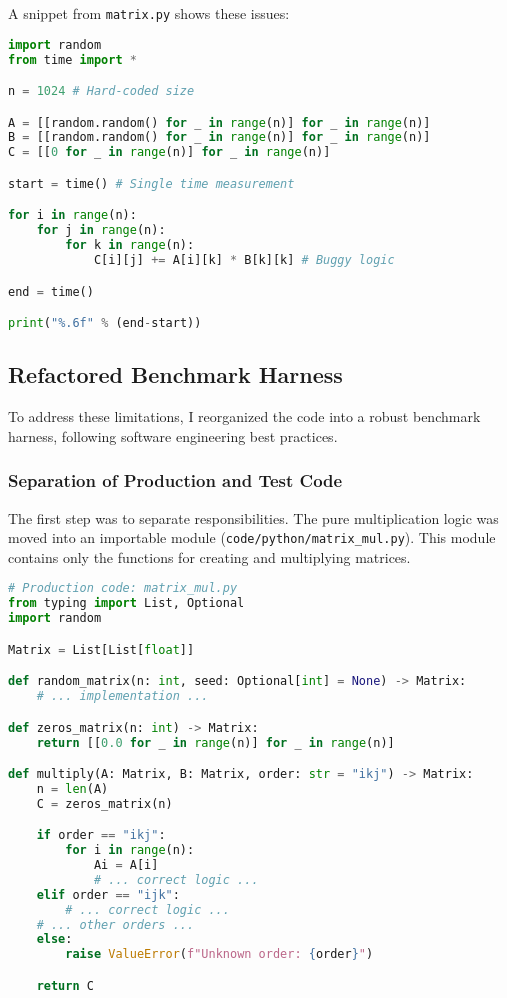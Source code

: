 \documentclass[a4paper]{article}
\begin{document}
A snippet from \texttt{matrix.py} shows these issues:
\begin{lstlisting}[language=Python, caption={Snippet from the initial 'matrix.py'}]
import random
from time import *

n = 1024 # Hard-coded size

A = [[random.random() for _ in range(n)] for _ in range(n)]
B = [[random.random() for _ in range(n)] for _ in range(n)]
C = [[0 for _ in range(n)] for _ in range(n)]

start = time() # Single time measurement

for i in range(n):
    for j in range(n):
        for k in range(n):
            C[i][j] += A[i][k] * B[k][k] # Buggy logic

end = time()

print("%.6f" % (end-start))
\end{lstlisting}

\subsection{Refactored Benchmark Harness}
To address these limitations, I reorganized the code into a robust benchmark harness, following software engineering best practices.

\subsubsection{Separation of Production and Test Code}
The first step was to separate responsibilities. The pure multiplication logic was moved into an importable module (\texttt{code/python/matrix\_mul.py}). This module contains only the functions for creating and multiplying matrices.

\begin{lstlisting}[language=Python, caption={Snippet from the refactored 'matrix\_mul.py'}]
# Production code: matrix_mul.py
from typing import List, Optional
import random

Matrix = List[List[float]]

def random_matrix(n: int, seed: Optional[int] = None) -> Matrix:
    # ... implementation ...

def zeros_matrix(n: int) -> Matrix:
    return [[0.0 for _ in range(n)] for _ in range(n)]

def multiply(A: Matrix, B: Matrix, order: str = "ikj") -> Matrix:
    n = len(A)
    C = zeros_matrix(n)

    if order == "ikj":
        for i in range(n):
            Ai = A[i]
            # ... correct logic ...
    elif order == "ijk":
        # ... correct logic ...
    # ... other orders ...
    else:
        raise ValueError(f"Unknown order: {order}")

    return C
\end{lstlisting}
\end{document}
